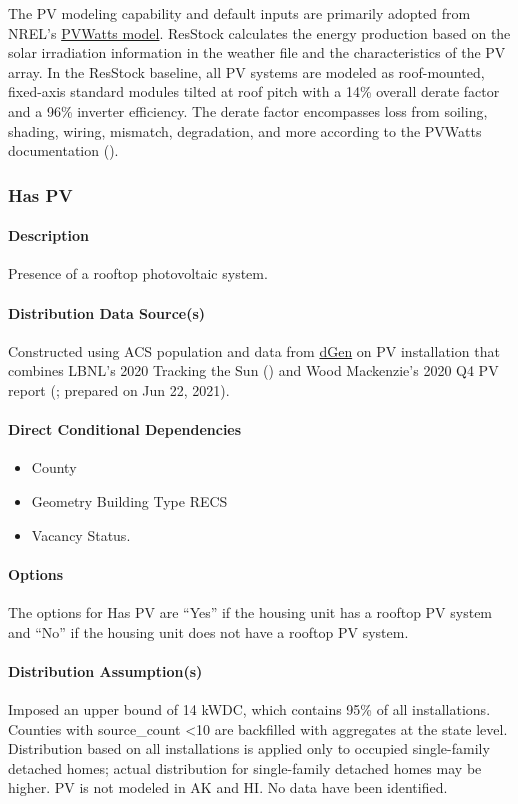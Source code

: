 The PV modeling capability and default inputs are primarily adopted from NREL's \href{https://pvwatts.nrel.gov/index.php}{PVWatts model}. ResStock calculates the energy production based on the solar irradiation information in the weather file and the characteristics of the PV array. In the ResStock baseline, all PV systems are modeled as roof-mounted, fixed-axis standard modules tilted at roof pitch with a 14\% overall derate factor and a 96\% inverter efficiency. The derate factor encompasses loss from soiling, shading, wiring, mismatch, degradation, and more according to the PVWatts documentation (\cite{pvwatts_doc}).

\subsubsection{Has PV} \label{sec:has_pv}
\paragraph{Description}
Presence of a rooftop photovoltaic system.

\paragraph{Distribution Data Source(s)}
Constructed using ACS population and data from \href{https://www.nrel.gov/analysis/dgen/}{dGen} on PV installation that combines LBNL's 2020 Tracking the Sun (\cite{LBNLTTS2019}) and Wood Mackenzie's 2020 Q4 PV report (\cite{WoodsMackenzie2020}; prepared on Jun 22, 2021). 

\paragraph{Direct Conditional Dependencies}
\begin{itemize}
    \item County
    \item Geometry Building Type RECS
    \item Vacancy Status.
\end{itemize}

\paragraph{Options}
The options for Has PV are ``Yes'' if the housing unit has a rooftop PV system and ``No'' if the housing unit does not have a rooftop PV system.

\paragraph{Distribution Assumption(s)}
Imposed an upper bound of 14 kWDC, which contains 95\% of all installations. Counties with source\_count <10 are backfilled with aggregates at the state level. Distribution based on all installations is applied only to occupied single-family detached homes; actual distribution for single-family detached homes may be higher. PV is not modeled in AK and HI. No data have been identified. 

